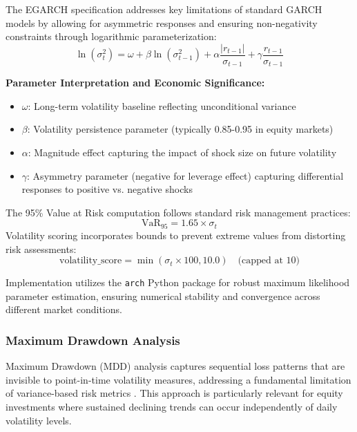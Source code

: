\documentclass[3p,times,procedia]{elsarticle}
\begin{document}
The EGARCH specification addresses key limitations of standard GARCH models by allowing for asymmetric responses and ensuring non-negativity constraints through logarithmic parameterization:
\vspace{-0.4cm}
\begin{equation}
\ln(\sigma_t^2) = \omega + \beta \ln(\sigma_{t-1}^2) + \alpha \frac{|r_{t-1}|}{\sigma_{t-1}} + \gamma \frac{r_{t-1}}{\sigma_{t-1}}
\end{equation}

\textbf{Parameter Interpretation and Economic Significance:}
\begin{itemize}
    \item $\omega$: Long-term volatility baseline reflecting unconditional variance
    \item $\beta$: Volatility persistence parameter (typically 0.85-0.95 in equity markets) \cite{Bollerslev1986}
    \item $\alpha$: Magnitude effect capturing the impact of shock size on future volatility
    \item $\gamma$: Asymmetry parameter (negative for leverage effect) capturing differential responses to positive vs. negative shocks \cite{Black1976}
\end{itemize}

The 95\% Value at Risk computation follows standard risk management practices:
\vspace{-0.4cm}
\begin{equation}
\text{VaR}_{95} = 1.65 \times \sigma_t
\end{equation}
Volatility scoring incorporates bounds to prevent extreme values from distorting risk assessments:
\vspace{-0.4cm}
\begin{equation}
\text{volatility\_score} = \min(\sigma_t \times 100, 10.0) \quad \text{(capped at 10)}
\end{equation}

Implementation utilizes the \texttt{arch} Python package for robust maximum likelihood parameter estimation, ensuring numerical stability and convergence across different market conditions.

\subsubsection{{Maximum Drawdown Analysis}}

Maximum Drawdown (MDD) analysis captures sequential loss patterns that are invisible to point-in-time volatility measures, addressing a fundamental limitation of variance-based risk metrics \cite{Jorion2001}. This approach is particularly relevant for equity investments where sustained declining trends can occur independently of daily volatility levels.
\end{document}
